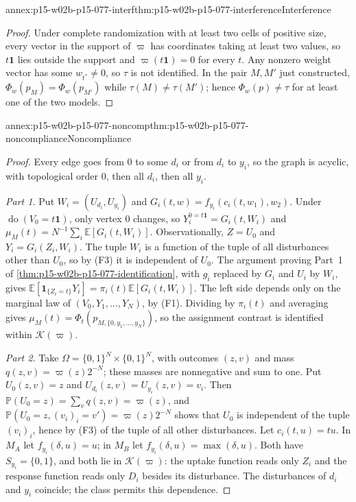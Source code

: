 \begin{annexitem}{annex:p15-w02b-p15-077-interf}{thm:p15-w02b-p15-077-interference}{Interference}
\begin{proof}
Under complete randomization with at least two cells of positive size,
every vector in the support of \(\varpi\) has coordinates taking at least
two values, so \(t\mathbf 1\) lies outside the support and
\(\varpi(t\mathbf 1)=0\) for every \(t\). Any nonzero weight vector has
some \(w_{t^*}\ne0\), so \(\tau\) is not identified. In the pair
\(M,M'\) just constructed, \(\Phi_w(p_M)=\Phi_w(p_{M'})\) while
\(\tau(M)\ne\tau(M')\); hence \(\Phi_w(p)\ne\tau\) for at least one of
the two models.
\end{proof}
\end{annexitem}

\begin{annexitem}{annex:p15-w02b-p15-077-noncomp}{thm:p15-w02b-p15-077-noncompliance}{Noncompliance}
\begin{proof}
Every edge goes from \(0\) to some \(d_i\) or from \(d_i\) to
\(y_i\), so the graph is acyclic, with topological order \(0\), then all
\(d_i\), then all \(y_i\).

\emph{Part 1.} Put \(W_i=(U_{d_i},U_{y_i})\) and
\(G_i(t,w)=f_{y_i}(c_i(t,w_1),w_2)\). Under
\(\operatorname{do}(V_0=t\mathbf 1)\), only vertex \(0\) changes, so
\(Y_i^{0=t\mathbf 1}=G_i(t,W_i)\) and
\(\mu_M(t)=N^{-1}\sum_i\mathbb E[G_i(t,W_i)]\). Observationally,
\(Z=U_0\) and \(Y_i=G_i(Z_i,W_i)\). The tuple \(W_i\) is a function of
the tuple of all disturbances other than \(U_0\), so by (F3) it is
independent of \(U_0\). The argument proving Part~1 of
\cref{thm:p15-w02b-p15-077-identification}, with \(g_i\) replaced by
\(G_i\) and \(U_i\) by \(W_i\), gives
\(\mathbb E[\mathbf 1_{\{Z_i=t\}}Y_i]=\pi_i(t)\mathbb E[G_i(t,W_i)]\).
The left side depends only on the marginal law of
\((V_0,Y_1,\ldots,Y_N)\), by (F1). Dividing by \(\pi_i(t)\) and averaging
gives \(\mu_M(t)=\Phi_t(p_{M,\{0,y_1,\ldots,y_N\}})\), so the assignment
contrast is identified within \(\mathcal K(\varpi)\).

\emph{Part 2.} Take \(\Omega=\{0,1\}^N\times\{0,1\}^N\), with
outcomes \((z,v)\) and mass \(q(z,v)=\varpi(z)2^{-N}\); these masses are
nonnegative and sum to one. Put \(U_0(z,v)=z\) and
\(U_{d_i}(z,v)=U_{y_i}(z,v)=v_i\). Then
\(\mathbb P(U_0=z)=\sum_vq(z,v)=\varpi(z)\), and
\(\mathbb P(U_0=z,(v_i)_i=v')=\varpi(z)2^{-N}\) shows that \(U_0\) is
independent of the tuple \((v_i)_i\), hence by (F3) of the tuple of all
other disturbances. Let \(c_i(t,u)=tu\). In \(M_A\) let
\(f_{y_i}(\delta,u)=u\); in \(M_B\) let
\(f_{y_i}(\delta,u)=\max(\delta,u)\). Both have
\(S_{y_i}=\{0,1\}\), and both lie in \(\mathcal K(\varpi)\): the uptake
function reads only \(Z_i\) and the response function reads only
\(D_i\) besides its disturbance. The disturbances of \(d_i\) and \(y_i\)
coincide; the class permits this dependence.


\end{proof}
\end{annexitem}
